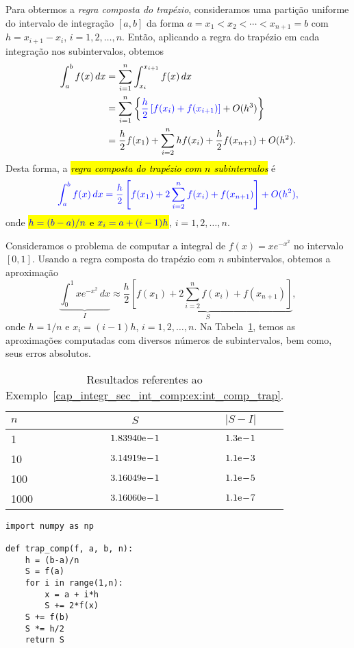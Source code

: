 Para obtermos a \emph{regra composta do trapézio}, consideramos uma partição uniforme do intervalo de integração $[a, b]$ da forma $a=x_1 < x_2 < \cdots < x_{n+1}=b$ com $h=x_{i+1}-x_{i}$, $i=1, 2, \dotsc, n$. Então, aplicando a regra do trapézio em cada integração nos subintervalos, obtemos
\begin{subequations}
  \begin{align}
    \int_a^bf(x)\,dx &= \sum_{i=1}^n \int_{x_i}^{x_{i+1}} f(x)\,dx\\
                     &= \sum_{i=1}^n \left\{{\color{blue}\frac{h}{2}\left[f(x_i)+f(x_{i+1})\right]} + O(h^3)\right\}\\
                     &= \frac{h}{2}f(x_1) + \sum_{i=2}^{n} hf(x_i) + \frac{h}{2}f(x_{n+1}) + O(h^2). 
  \end{align}
\end{subequations}
Desta forma, a \hl{\emph{regra composta do trapézio com $n$ subintervalos}} é
\begin{equation}\color{blue}\int_a^b f(x)\,dx = \frac{h}{2}\left[f(x_1) + 2\sum_{i=2}^{n} f(x_i) + f(x_{n+1})\right] + O(h^2),
\end{equation}
onde \hl{$\color{blue}h=(b-a)/n$ e $\color{blue}x_i = a + (i-1)h$}, $i=1, 2, \dotsc, n$.

\begin{ex}\label{cap_integr_sec_int_comp:ex:int_comp_trap}
Consideramos o problema de computar a integral de $f(x)=xe^{-x^2}$ no intervalo $[0, 1]$. Usando a regra composta do trapézio com $n$ subintervalos, obtemos a aproximação
  \begin{equation}
    \underbrace{\int_0^1 xe^{-x^2}\,dx}_{I} \approx \underbrace{\frac{h}{2}\left[f(x_1) + 2\sum_{i=2}^{n} f(x_i) + f(x_{n+1})\right]}_{S},
  \end{equation}
onde $h=1/n$ e $x_i = (i-1)h$, $i=1, 2, \dotsc, n$. Na Tabela~\ref{cap_integr_sec_int_comp:tab:ex_int_comp_trap}, temos as aproximações computadas com diversos números de subintervalos, bem como, seus erros absolutos.

\begin{table}[H]
  \centering
  \caption{Resultados referentes ao Exemplo~\ref{cap_integr_sec_int_comp:ex:int_comp_trap}.}
  \begin{tabular}{l|cc}\toprule
    $n$ & $S$ & $|S-I|$ \\\midrule
    1   & $1.83940\mathrm{e}\!-\!1$ & $1.3\mathrm{e}\!-\!1$ \\
    10  & $3.14919\mathrm{e}\!-\!1$ & $1.1\mathrm{e}\!-\!3$ \\
    100 & $3.16049\mathrm{e}\!-\!1$ & $1.1\mathrm{e}\!-\!5$ \\
    1000& $3.16060\mathrm{e}\!-\!1$ & $1.1\mathrm{e}\!-\!7$ \\\bottomrule
  \end{tabular}
  \label{cap_integr_sec_int_comp:tab:ex_int_comp_trap}
\end{table}

\begin{lstlisting}[caption=trap\_comp.py]
import numpy as np

def trap_comp(f, a, b, n):
    h = (b-a)/n
    S = f(a)
    for i in range(1,n):
        x = a + i*h
        S += 2*f(x)
    S += f(b)
    S *= h/2
    return S
\end{lstlisting}
\end{ex}

